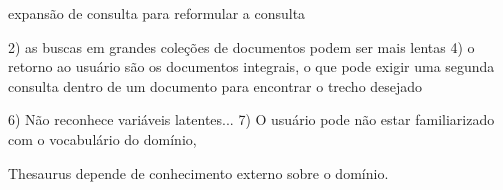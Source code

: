 expansão de consulta para reformular a consulta

2) as buscas em grandes coleções de documentos podem ser mais lentas 
4) o retorno ao usuário são os documentos integrais, o que pode exigir uma segunda consulta dentro de um documento para encontrar o trecho desejado


6) Não reconhece variáveis latentes...
7) O usuário pode não estar familiarizado com o vocabulário do domínio, %

Thesaurus depende de conhecimento externo sobre o domínio.










